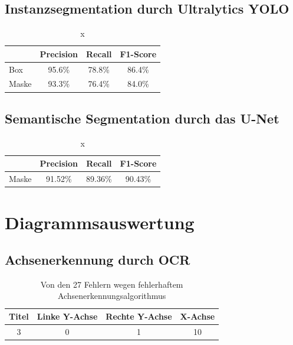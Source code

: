 \subsection{Instanzsegmentation durch Ultralytics YOLO}
\begin{table}[H]
    \centering
    \begin{tabular}{|l|c|c|c|}
        \hline
        \rowcolor[HTML]{EFEFEF}
              & Precision & Recall & F1-Score \\ \hline
        Box   & 95.6\%    & 78.8\% & 86.4\%   \\ \hline
        Maske & 93.3\%    & 76.4\% & 84.0\%   \\ \hline
    \end{tabular}
    \caption{x}
\end{table}

\subsection{Semantische Segmentation durch das U-Net}
\begin{table}[H]
    \centering
    \begin{tabular}{|l|c|c|c|}
        \hline
        \rowcolor[HTML]{EFEFEF}
              & Precision & Recall  & F1-Score \\ \hline
        Maske & 91.52\%   & 89.36\% & 90.43\%  \\ \hline
    \end{tabular}
    \caption{x}
\end{table}

\section{Diagrammsauswertung}
\subsection{Achsenerkennung durch OCR}
\begin{table}[H]
    \centering
    \begin{tabular}{|c|c|c|c|}
        \hline
        \rowcolor[HTML]{EFEFEF}
        Titel & Linke Y-Achse & Rechte Y-Achse & X-Achse \\ \hline
        3     & 0             & 1              & 10      \\ \hline
    \end{tabular}
    \caption{Von den 27 Fehlern wegen fehlerhaftem Achsenerkennungsalgorithmus}
\end{table}

